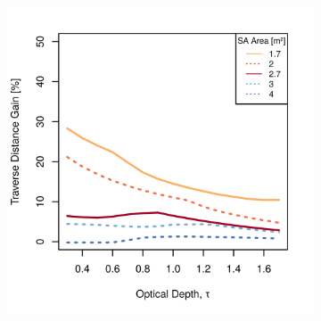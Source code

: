 \begin{figure}[h]
\captionsetup[subfigure]{justification=centering}
\vspace{-2ex}
	\centering
    \setlength{\subfigureWidth}{0.50\textwidth}
    \setlength{\graphicsHeight}{80mm}
    \hypersetup{hidelinks=true}%
    \begin{subfigure}[t]{\subfigureWidth}
        \centering
        \includegraphics[height=\graphicsHeight]{sections/design/solar-array/plots/ianichaos-75w-traverse-gains-for-different-sa-areas.png}
		\label{fig:plot:sub:ismenius-chaos-flat-traverse-gains-for-different-sa-area}
    \end{subfigure}\hfill
    \begin{subfigure}[t]{\subfigureWidth}
        \centering

\end{subfigure}
\end{figure}
